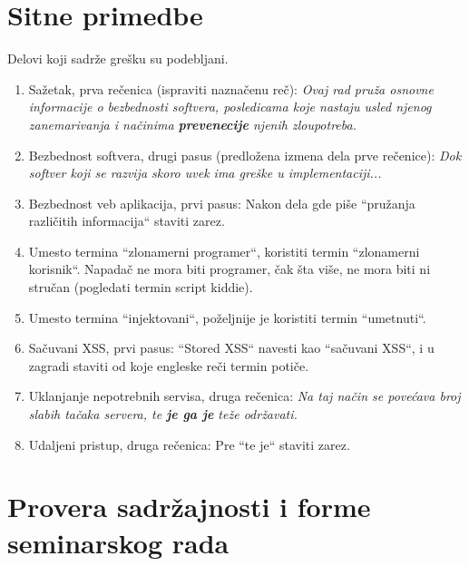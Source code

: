 \documentclass[a4paper]{article}
\begin{document}
\section{Sitne primedbe}
Delovi koji sadrže grešku su podebljani.
\begin{enumerate}
	\item Sažetak, prva rečenica (ispraviti naznačenu reč): \textit{Ovaj rad pruža osnovne informacije o bezbednosti softvera, posledicama koje nastaju usled njenog zanemarivanja i načinima \textbf{prevenecije} njenih zloupotreba.}
	\item Bezbednost softvera, drugi pasus (predložena izmena dela prve rečenice): \textit{Dok softver koji se razvija skoro uvek ima greške u implementaciji...}
	\item Bezbednost veb aplikacija, prvi pasus: Nakon dela gde piše ``pružanja različitih informacija`` staviti zarez.
	\item Umesto termina ``zlonamerni programer``, koristiti termin ``zlonamerni korisnik``. Napadač ne mora biti programer, čak šta više, ne mora biti ni stručan (pogledati termin script kiddie).
	\item Umesto termina ``injektovani``, poželjnije je koristiti termin ``umetnuti``.
	\item Sačuvani XSS, prvi pasus: ``Stored XSS`` navesti kao ``sačuvani XSS``, i u zagradi staviti od koje engleske reči termin potiče.
	\item Uklanjanje nepotrebnih servisa, druga rečenica: \textit{Na taj način se povećava broj slabih tačaka servera, te \textbf{je ga je} teže održavati.}
	\item Udaljeni pristup, druga rečenica: Pre ``te je`` staviti zarez.
\end{enumerate}

\section{Provera sadržajnosti i forme seminarskog rada}
\end{document}

